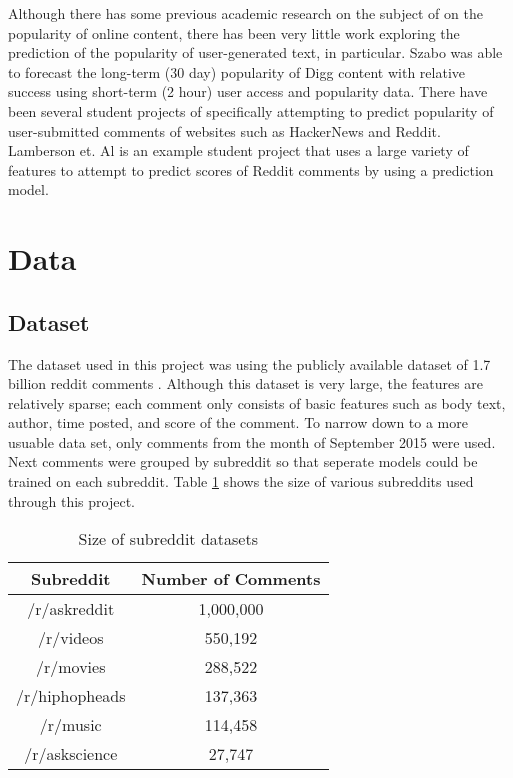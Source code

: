 \documentclass[11pt, twocolumn]{article}
\begin{document}
Although there has some previous academic research on the subject of on the popularity of online content, there has been very little work exploring the prediction of the popularity of user-generated text, in particular. Szabo \cite{predict_digg} was able to forecast the long-term (30 day) popularity of Digg content with relative success using short-term (2 hour) user access and popularity data. There have been several student projects of specifically attempting to predict popularity of user-submitted comments of websites such as HackerNews and Reddit. Lamberson et. Al \cite{lamberson} is an example student project that uses a large variety of features to attempt to predict scores of Reddit comments by using a prediction model. 

\section{Data}
	\subsection{Dataset}
	The dataset used in this project was using the publicly available dataset of 1.7 billion reddit comments \cite{dataset}. Although this dataset is very large, the features are relatively sparse; each comment only consists of basic features such as body text, author, time posted, and score of the comment. To narrow down to a more usuable data set, only comments from the month of September 2015 were used. Next comments were grouped by subreddit so that seperate models could be trained on each subreddit. Table \ref{size_table} shows the size of various subreddits used through this project.
	
	\begin{table}[h!]
	\centering
	\begin{tabular}{ | c | c |}
	\hline
	Subreddit & Number of Comments \\
	\hline
	\hline
	/r/askreddit & 1,000,000 \\
	\hline
	/r/videos & 550,192 \\
	\hline
	/r/movies & 288,522 \\
	\hline
	/r/hiphopheads & 137,363 \\
	\hline
	/r/music & 114,458 \\
	\hline
	/r/askscience & 27,747 \\
	\hline
	\end{tabular}
	\caption{Size of subreddit datasets}
	\label{size_table}
	\end{table}
	
\end{document}
